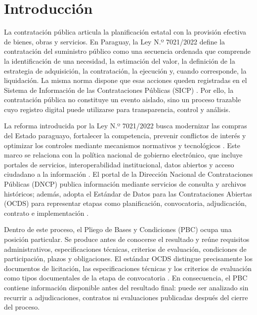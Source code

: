 \clearpage
{}
\chapter{Introducción}
\label{sec:introduccion}

La contratación pública articula la planificación estatal con la provisión efectiva de bienes, obras y servicios. En Paraguay, la Ley N.º 7021/2022 define la contratación del suministro público como una secuencia ordenada que comprende la identificación de una necesidad, la estimación del valor, la definición de la estrategia de adquisición, la contratación, la ejecución y, cuando corresponde, la liquidación. La misma norma dispone que esas acciones queden registradas en el Sistema de Información de las Contrataciones Públicas (SICP) \parencite{ley7021paraguay}. Por ello, la contratación pública no constituye un evento aislado, sino un proceso trazable cuyo registro digital puede utilizarse para transparencia, control y análisis.

La reforma introducida por la Ley N.º 7021/2022 busca modernizar las compras del Estado paraguayo, fortalecer la competencia, prevenir conflictos de interés y optimizar los controles mediante mecanismos normativos y tecnológicos \parencite{dncpLey7021}. Este marco se relaciona con la política nacional de gobierno electrónico, que incluye portales de servicios, interoperabilidad institucional, datos abiertos y acceso ciudadano a la información \parencite{miticGobiernoElectronico}. El portal de la Dirección Nacional de Contrataciones Públicas (DNCP) publica información mediante servicios de consulta y archivos históricos; además, adopta el Estándar de Datos para las Contrataciones Abiertas (OCDS) para representar etapas como planificación, convocatoria, adjudicación, contrato e implementación \parencite{dncpOpenContracting,ocdsPrimer}.

Dentro de este proceso, el Pliego de Bases y Condiciones (PBC) ocupa una posición particular. Se produce antes de conocerse el resultado y reúne requisitos administrativos, especificaciones técnicas, criterios de evaluación, condiciones de participación, plazos y obligaciones. El estándar OCDS distingue precisamente los documentos de licitación, las especificaciones técnicas y los criterios de evaluación como tipos documentales de la etapa de convocatoria \parencite{ocdsCodelists}. En consecuencia, el PBC contiene información disponible antes del resultado final: puede ser analizado sin recurrir a adjudicaciones, contratos ni evaluaciones publicadas después del cierre del proceso.

